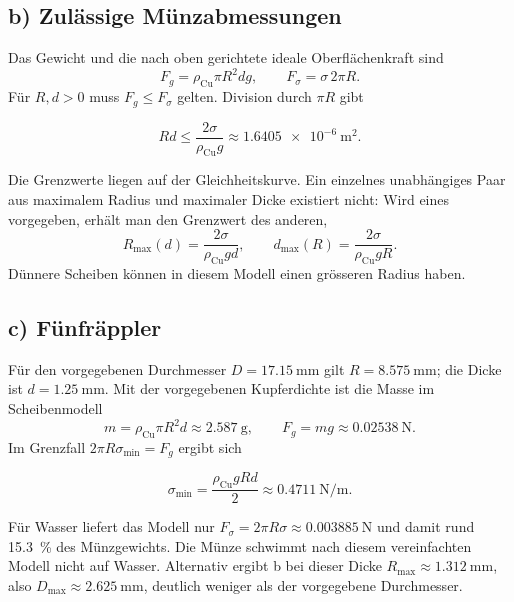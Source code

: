 \subsection*{b) Zulässige Münzabmessungen}
Das Gewicht und die nach oben gerichtete ideale Oberflächenkraft sind
\begin{equation}
  F_g=\rho_\mathrm{Cu}\pi R^2 d g,
  \qquad F_\sigma=\sigma\,2\pi R.
\end{equation}
Für $R,d>0$ muss $F_g\leq F_\sigma$ gelten. Division durch $\pi R$ gibt
\begin{ergebnis}
\begin{equation*}
  R d\leq\frac{2\sigma}{\rho_\mathrm{Cu}g}
  \approx\qty{1.6405e-6}{\metre\squared}.
\end{equation*}
\end{ergebnis}
Die Grenzwerte liegen auf der Gleichheitskurve. Ein einzelnes unabhängiges
Paar aus maximalem Radius und maximaler Dicke existiert nicht: Wird eines
vorgegeben, erhält man den Grenzwert des anderen,
\begin{equation}
  R_\mathrm{max}(d)=\frac{2\sigma}{\rho_\mathrm{Cu}g d},
  \qquad d_\mathrm{max}(R)=\frac{2\sigma}{\rho_\mathrm{Cu}g R}.
\end{equation}
Dünnere Scheiben können in diesem Modell einen grösseren Radius haben.

\subsection*{c) Fünfräppler}
Für den vorgegebenen Durchmesser $D=\qty{17.15}{\milli\metre}$ gilt
$R=\qty{8.575}{\milli\metre}$; die Dicke ist
$d=\qty{1.25}{\milli\metre}$. Mit der vorgegebenen Kupferdichte ist die
Masse im Scheibenmodell
\begin{equation}
  m=\rho_\mathrm{Cu}\pi R^2d\approx\qty{2.587}{\gram},
  \qquad F_g=mg\approx\qty{0.02538}{\newton}.
\end{equation}
Im Grenzfall $2\pi R\sigma_\mathrm{min}=F_g$ ergibt sich
\begin{ergebnis}
\begin{equation*}
  \sigma_\mathrm{min}=\frac{\rho_\mathrm{Cu}gRd}{2}
  \approx\qty{0.4711}{\newton\per\metre}.
\end{equation*}
\end{ergebnis}
Für Wasser liefert das Modell nur $F_\sigma=2\pi R\sigma
\approx\qty{0.003885}{\newton}$ und damit rund \qty{15.3}{\percent} des
Münzgewichts. Die Münze schwimmt nach diesem vereinfachten Modell nicht auf
Wasser. Alternativ ergibt b bei dieser Dicke $R_\mathrm{max}\approx
\qty{1.312}{\milli\metre}$, also $D_\mathrm{max}\approx
\qty{2.625}{\milli\metre}$, deutlich weniger als der vorgegebene Durchmesser.


